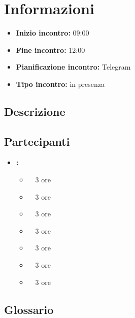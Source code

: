 \section{Informazioni}
\begin{itemize}
	\item \textbf{Inizio incontro:} 09:00
	\item \textbf{Fine incontro:} 12:00
	\item \textbf{Pianificazione incontro:} Telegram
	\item \textbf{Tipo incontro:} in presenza
\end{itemize}

\subsection{Descrizione}
\DocDescription

\subsection{Partecipanti}

\begin{itemize}
	\item \textbf{\GroupName:}
	\begin{itemize}
		\item \riccardo \ \rightarrow\ 3 ore
		\item \raul \ \rightarrow\ 3 ore
		\item \marco \ \rightarrow\ 3 ore
		\item \martina \ \rightarrow\ 3 ore
		\item \tommaso \ \rightarrow\ 3 ore
		\item \sebastiano \ \rightarrow\ 3 ore
		\item \mattia \ \rightarrow\ 3 ore
	\end{itemize}
\end{itemize}

\subsection{Glossario}
\GlossarioIntroduzione

\clearpage
